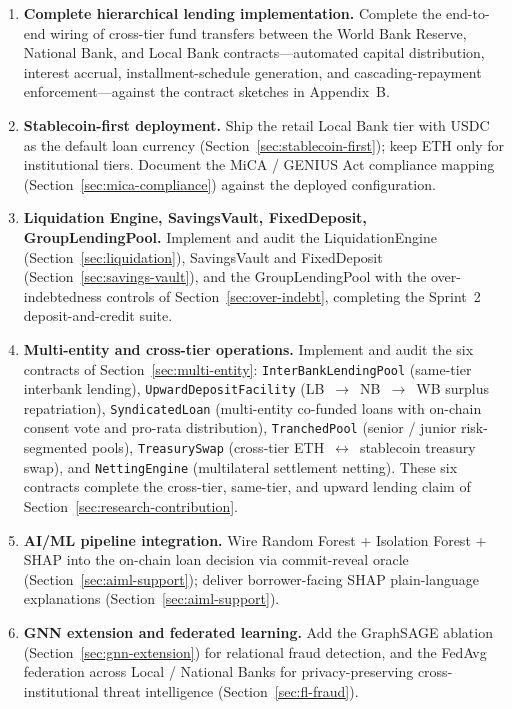 \documentclass[12pt,a4paper]{report}
\begin{document}
\begin{enumerate}[noitemsep]
\item \textbf{Complete hierarchical lending implementation.} Complete the end-to-end wiring of cross-tier fund transfers between the World Bank Reserve, National Bank, and Local Bank contracts---automated capital distribution, interest accrual, installment-schedule generation, and cascading-repayment enforcement---against the contract sketches in Appendix~B.
\item \textbf{Stablecoin-first deployment.} Ship the retail Local Bank tier with USDC as the default loan currency (Section~\ref{sec:stablecoin-first}); keep ETH only for institutional tiers. Document the MiCA / GENIUS Act compliance mapping (Section~\ref{sec:mica-compliance}) against the deployed configuration.
\item \textbf{Liquidation Engine, SavingsVault, FixedDeposit, GroupLendingPool.} Implement and audit the LiquidationEngine (Section~\ref{sec:liquidation}), SavingsVault and FixedDeposit (Section~\ref{sec:savings-vault}), and the GroupLendingPool with the over-indebtedness controls of Section~\ref{sec:over-indebt}, completing the Sprint~2 deposit-and-credit suite.
\item \textbf{Multi-entity and cross-tier operations.} Implement and audit the six contracts of Section~\ref{sec:multi-entity}: \texttt{InterBankLendingPool} (same-tier interbank lending), \texttt{UpwardDepositFacility} (LB~$\to$~NB~$\to$~WB surplus repatriation), \texttt{SyndicatedLoan} (multi-entity co-funded loans with on-chain consent vote and pro-rata distribution), \texttt{TranchedPool} (senior / junior risk-segmented pools), \texttt{TreasurySwap} (cross-tier ETH~$\leftrightarrow$~stablecoin treasury swap), and \texttt{NettingEngine} (multilateral settlement netting). These six contracts complete the cross-tier, same-tier, and upward lending claim of Section~\ref{sec:research-contribution}.
\item \textbf{AI/ML pipeline integration.} Wire Random Forest + Isolation Forest + SHAP into the on-chain loan decision via commit-reveal oracle (Section~\ref{sec:aiml-support}); deliver borrower-facing SHAP plain-language explanations (Section~\ref{sec:aiml-support}).
\item \textbf{GNN extension and federated learning.} Add the GraphSAGE ablation (Section~\ref{sec:gnn-extension}) for relational fraud detection, and the FedAvg federation across Local / National Banks for privacy-preserving cross-institutional threat intelligence (Section~\ref{sec:fl-fraud}).

\end{enumerate}
\end{document}
